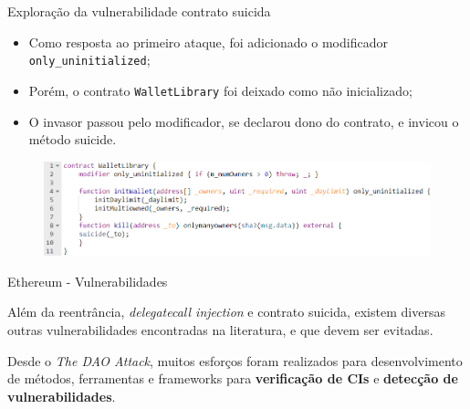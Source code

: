 \begin{frame}{Exploração da vulnerabilidade contrato suicida}
    \begin{itemize}
        \item Como resposta ao primeiro ataque, foi adicionado o modificador \texttt{only\_uninitialized};
        \item Porém, o contrato \texttt{WalletLibrary} foi deixado como não inicializado;
        \item O invasor passou pelo modificador, se declarou dono do contrato, e invicou o método suicide.
    \end{itemize}
    \begin{figure}[!htb]
     \centering
     \includegraphics[scale=0.4]{figuras/contratos-inteligentes/parity-corrigido.png}
    \end{figure}    
\end{frame}

\begin{frame}{Ethereum - Vulnerabilidades}
    \begin{block}{}
    Além da reentrância, \textit{delegatecall injection} e contrato suicida, existem diversas outras vulnerabilidades encontradas na literatura, e que devem ser evitadas.
    \end{block}
    \begin{block}{}
    Desde o \textit{The DAO Attack}, muitos esforços foram realizados para desenvolvimento de métodos, ferramentas e frameworks para \textbf{verificação de CIs} e \textbf{detecção de vulnerabilidades}.
    \end{block}
\end{frame}